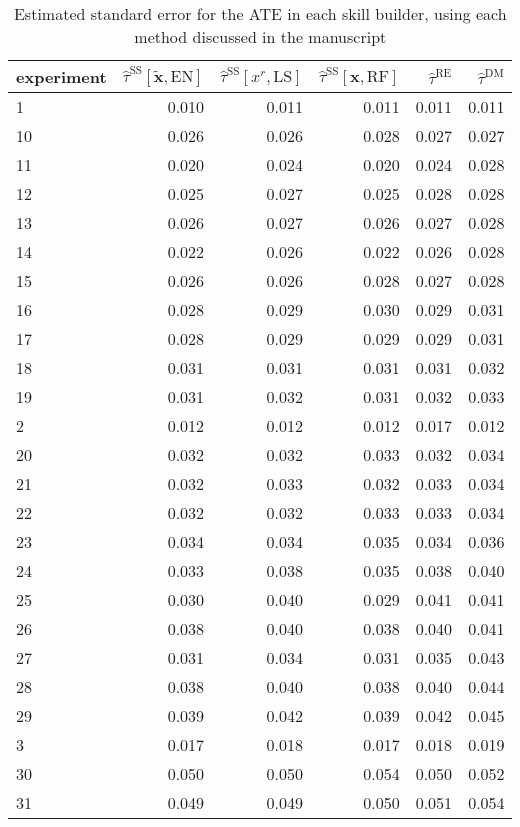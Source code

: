 \documentclass[12pt]{article}\usepackage[]{graphicx}\usepackage[]{xcolor}
\newcommand{\bx}{{\bm{x}}}
\newcommand{\xt}{{\tilde{\bm{x}}}}
\newcommand{\predr}{x^r}
\newcommand{\tsd}{\hat{\tau}^{\mathrm{DM}}}
\newcommand{\tss}{\hat{\tau}^{\mathrm{SS}}}
\newcommand{\trc}{\tss[\predr, \mathrm{LS}]}
\newcommand{\trcpen}{\tss[\xt, \mathrm{EN}]}
\newcommand{\trebar}{\hat{\tau}^{\mathrm{RE}}}
\begin{document}
\begin{table}
\caption{\label{tab:tab:SEs}Estimated standard error for the ATE
     in each skill builder, using each method 
     discussed in the manuscript}
\centering
\begin{tabular}[t]{l|r|r|r|r|r}
\hline
experiment & $\trcpen$ & $\trc$ & $\tss[\bx,\mathrm{RF}]$ & $\trebar$ & $\tsd$\\
\hline
1 & 0.010 & 0.011 & 0.011 & 0.011 & 0.011\\
\hline
10 & 0.026 & 0.026 & 0.028 & 0.027 & 0.027\\
\hline
11 & 0.020 & 0.024 & 0.020 & 0.024 & 0.028\\
\hline
12 & 0.025 & 0.027 & 0.025 & 0.028 & 0.028\\
\hline
13 & 0.026 & 0.027 & 0.026 & 0.027 & 0.028\\
\hline
14 & 0.022 & 0.026 & 0.022 & 0.026 & 0.028\\
\hline
15 & 0.026 & 0.026 & 0.028 & 0.027 & 0.028\\
\hline
16 & 0.028 & 0.029 & 0.030 & 0.029 & 0.031\\
\hline
17 & 0.028 & 0.029 & 0.029 & 0.029 & 0.031\\
\hline
18 & 0.031 & 0.031 & 0.031 & 0.031 & 0.032\\
\hline
19 & 0.031 & 0.032 & 0.031 & 0.032 & 0.033\\
\hline
2 & 0.012 & 0.012 & 0.012 & 0.017 & 0.012\\
\hline
20 & 0.032 & 0.032 & 0.033 & 0.032 & 0.034\\
\hline
21 & 0.032 & 0.033 & 0.032 & 0.033 & 0.034\\
\hline
22 & 0.032 & 0.032 & 0.033 & 0.033 & 0.034\\
\hline
23 & 0.034 & 0.034 & 0.035 & 0.034 & 0.036\\
\hline
24 & 0.033 & 0.038 & 0.035 & 0.038 & 0.040\\
\hline
25 & 0.030 & 0.040 & 0.029 & 0.041 & 0.041\\
\hline
26 & 0.038 & 0.040 & 0.038 & 0.040 & 0.041\\
\hline
27 & 0.031 & 0.034 & 0.031 & 0.035 & 0.043\\
\hline
28 & 0.038 & 0.040 & 0.038 & 0.040 & 0.044\\
\hline
29 & 0.039 & 0.042 & 0.039 & 0.042 & 0.045\\
\hline
3 & 0.017 & 0.018 & 0.017 & 0.018 & 0.019\\
\hline
30 & 0.050 & 0.050 & 0.054 & 0.050 & 0.052\\
\hline
31 & 0.049 & 0.049 & 0.050 & 0.051 & 0.054\\

\end{tabular}
\end{table}
\end{document}
